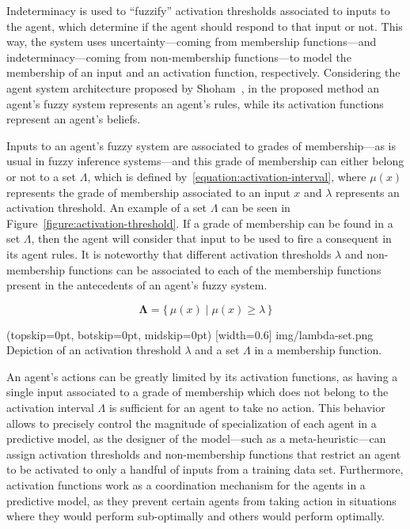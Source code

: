 ﻿\documentclass{ieeeaccess}
\begin{document}
Indeterminacy is used to ``fuzzify'' activation thresholds associated to inputs
to the agent, which determine if the agent should respond to that input or
not. This way, the system uses uncertainty---coming from membership
functions---and indeterminacy---coming from non-membership functions---to model
the membership of an input and an activation function,
respectively. Considering the agent system architecture proposed by
Shoham~\cite{Shoham1993}, in the proposed method an agent's fuzzy system
represents an agent's rules, while its activation functions represent an
agent's beliefs.

Inputs to an agent's fuzzy system are associated to grades of
membership---as is usual in fuzzy inference systems---and this grade
of membership can either belong or not to a set $\Lambda$, which is
defined by~\ref{equation:activation-interval}, where $\mu(x)$
represents the grade of membership associated to an input $x$ and
$\lambda$ represents an activation threshold. An example of a set
$\Lambda$ can be seen in Figure~\ref{figure:activation-threshold}. If
a grade of membership can be found in a set $\Lambda$, then the agent
will consider that input to be used to fire a consequent in its agent
rules. It is noteworthy that different activation thresholds $\lambda$
and non-membership functions can be associated to each of the
membership functions present in the antecedents of an agent's fuzzy
system.

\begin{equation}
  \label{equation:activation-interval}
  \bm{\Lambda} = \{\,\mu(x) \mid \mu(x) \geq \lambda \,\}
\end{equation}

\Figure[](topskip=0pt, botskip=0pt, midskip=0pt)
[width=0.6\linewidth]
{img/lambda-set.png}
{Depiction of an activation threshold $\lambda$ and a set $\Lambda$ in a membership function.
  \label{figure:activation-threshold}}

An agent's actions can be greatly limited by its activation functions, as having
a single input associated to a grade of membership which does not belong to the
activation interval $\Lambda$ is sufficient for an agent to take no action. This
behavior allows to precisely control the magnitude of specialization of each agent
in a predictive model, as the designer of the model---such as a
meta-heuristic---can assign activation thresholds and non-membership functions
that restrict an agent to be activated to only a handful of inputs from a
training data set. Furthermore, activation functions work as a coordination
mechanism for the agents in a predictive model, as they prevent certain agents
from taking action in situations where they would perform sub-optimally and
others would perform optimally.
\end{document}
